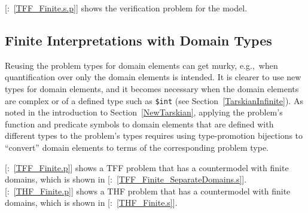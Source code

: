 \documentclass{ceurart}
\newcommand{\smalltt}[1]{\small \texttt{#1}}
\newcommand{\example}{{\scriptsize \faFile[regular]}}
\begin{document}
[\example{}:~\ref{TFF_Finite.s.p}] shows the verification problem for 
the model.

\subsection{Finite Interpretations with Domain Types}
\label{TarskianNewFiniteTypes}

Reusing the problem types for domain elements can get murky, e.g.,~when quantification over only 
the domain elements is intended. 
It is clearer to use new types for domain elements, and it becomes necessary when the domain 
elements are complex or of a defined type such as \smalltt{\$int} (see 
Section~\ref{TarskianInfinite}).
As noted in the introduction to Section~\ref{NewTarskian}, applying the problem's function and 
predicate symbols to domain elements that are defined with different types to the problem's types 
requires using type-promotion bijections to ``convert'' domain elements to terms of the 
corresponding problem type.

[\example{}:~\ref{TFF_Finite.p}] shows a TFF problem that has a 
countermodel with finite domains, which is shown in 
[\example{}:~\ref{TFF_Finite_SeparateDomains.s}].
[\example{}:~\ref{THF_Finite.p}] shows a THF problem that has a 
countermodel with finite domains, which is shown in
[\example{}:~\ref{THF_Finite.s}].
\end{document}
